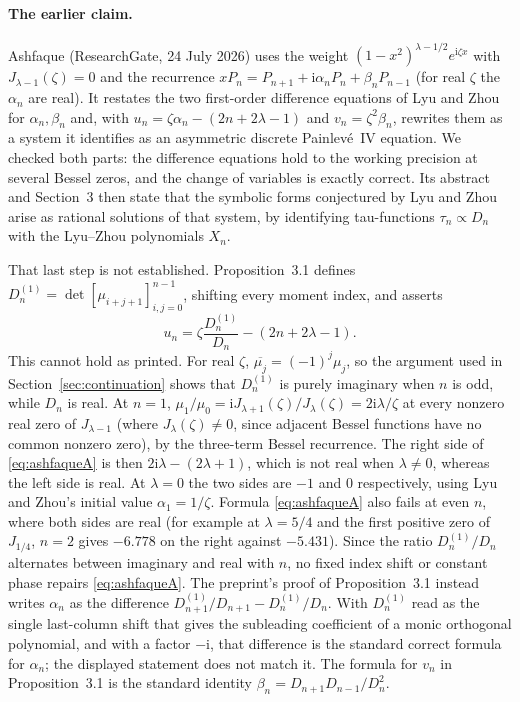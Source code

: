 \documentclass[11pt]{article}
\numberwithin{equation}{section}
\theoremstyle{remark}
\newcommand{\ii}{\mathrm{i}}
\begin{document}
\paragraph{The earlier claim.}
Ashfaque \cite{Ashfaque2026} (ResearchGate, 24 July 2026) uses the weight
$(1-x^2)^{\lambda-1/2}e^{\ii\zeta x}$ with $J_{\lambda-1}(\zeta)=0$ and the
recurrence $xP_n=P_{n+1}+\ii\alpha_nP_n+\beta_nP_{n-1}$ (for real $\zeta$
the $\alpha_n$ are real). It restates the two first-order difference
equations of Lyu and Zhou for $\alpha_n,\beta_n$ and, with
$u_n=\zeta\alpha_n-(2n+2\lambda-1)$ and $v_n=\zeta^2\beta_n$, rewrites them
as a system it identifies as an asymmetric discrete Painlev\'e~IV
equation. We checked both parts: the difference equations hold to the
working precision at several Bessel zeros, and the change of variables is
exactly correct. Its abstract and Section~3 then state that the symbolic
forms conjectured by Lyu and Zhou arise as rational solutions of that
system, by identifying tau-functions $\tau_n\propto D_n$ with the
Lyu--Zhou polynomials $X_n$.

That last step is not established. Proposition~3.1 defines
$D_n^{(1)}=\det[\mu_{i+j+1}]_{i,j=0}^{n-1}$, shifting every moment
index, and asserts
\begin{equation}\label{eq:ashfaqueA}
 u_n=\zeta\frac{D_n^{(1)}}{D_n}-(2n+2\lambda-1).
\end{equation}
This cannot hold as printed. For real $\zeta$,
$\overline{\mu_j}=(-1)^j\mu_j$, so the argument used in
Section~\ref{sec:continuation} shows that $D_n^{(1)}$ is purely imaginary
when $n$ is odd, while $D_n$ is real. At $n=1$,
$\mu_1/\mu_0=\ii J_{\lambda+1}(\zeta)/J_\lambda(\zeta)=2\ii\lambda/\zeta$ at
every nonzero real zero of $J_{\lambda-1}$ (where $J_\lambda(\zeta)\ne0$,
since adjacent Bessel functions have no common nonzero zero), by the
three-term Bessel recurrence. The right side of \eqref{eq:ashfaqueA} is
then $2\ii\lambda-(2\lambda+1)$, which is not real when $\lambda\ne0$,
whereas the left side is real. At $\lambda=0$ the two sides are $-1$ and
$0$ respectively, using Lyu and Zhou's initial value $\alpha_1=1/\zeta$.
Formula \eqref{eq:ashfaqueA} also fails at even $n$, where both sides are
real (for example at $\lambda=5/4$ and the first positive zero of
$J_{1/4}$, $n=2$ gives $-6.778$ on the right against $-5.431$). Since the ratio
$D_n^{(1)}/D_n$ alternates between imaginary and real with $n$, no fixed index
shift or constant phase repairs \eqref{eq:ashfaqueA}. The preprint's proof
of Proposition~3.1 instead writes $\alpha_n$ as the difference
$D^{(1)}_{n+1}/D_{n+1}-D^{(1)}_n/D_n$. With $D^{(1)}_n$ read as the single
last-column shift that gives the subleading coefficient of a monic
orthogonal polynomial, and with a factor $-\ii$, that difference is the
standard correct formula for $\alpha_n$; the displayed statement does not
match it. The formula for $v_n$ in Proposition~3.1 is the standard
identity $\beta_n=D_{n+1}D_{n-1}/D_n^2$.
\end{document}

